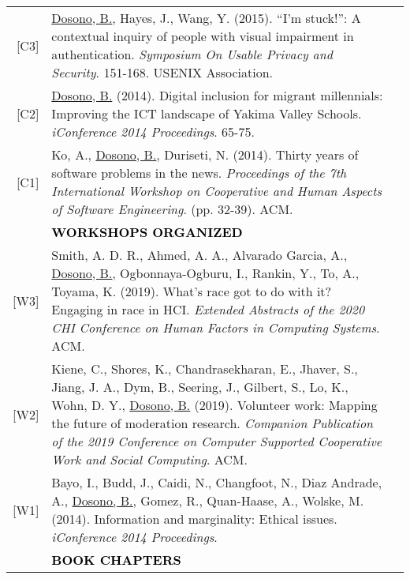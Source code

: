 \documentclass[11pt]{article}
\begin{document}
{{\begin{longtable}{Rp{0.75in}p{5.0in}}
\footnotesize{[C3]} & \href{https://www.usenix.org/conference/soups2015/proceedings/presentation/dosono}{Dosono, B.}, Hayes, J., Wang, Y. (2015). ``I'm stuck!'': A contextual inquiry of people with visual impairment in authentication. \textit{Symposium On Usable Privacy and Security}. 151-168. USENIX Association.\\

\footnotesize{[C2]} & \href{https://doi.org/10.9776/14043}{Dosono, B.} (2014). Digital inclusion for migrant millennials: Improving the ICT landscape of Yakima Valley Schools. \textit{iConference 2014 Proceedings}. 65-75.\\

\footnotesize{[C1]} & Ko, A., \href{https://dl.acm.org/authorize?N41457}{Dosono, B.}, Duriseti, N. (2014). Thirty years of software problems in the news. \textit{Proceedings of the 7th International Workshop on Cooperative and Human Aspects of Software Engineering}. (pp. 32-39). ACM.\\

& \textcolor{black}{\uppercase{\textbf{Workshops Organized}}}\\

\footnotesize{[W3]} & Smith, A. D. R., Ahmed, A. A., Alvarado Garcia, A., \href{https://dl.acm.org/doi/10.1145/3334480.3375156?cid=88158835957}{Dosono, B.}, Ogbonnaya-Ogburu, I., Rankin, Y., To, A., Toyama, K. (2019). What's race got to do with it? Engaging in race in HCI. \textit{Extended Abstracts of the 2020 CHI Conference on Human Factors in Computing Systems}. ACM.\\

\footnotesize{[W2]} & Kiene, C., Shores, K., Chandrasekharan, E., Jhaver, S., Jiang, J. A., Dym, B., Seering, J., Gilbert, S., Lo, K., Wohn, D. Y., \href{https://dl.acm.org/authorize?N690536}{Dosono, B.} (2019). Volunteer work: Mapping the future of moderation research. \textit{Companion Publication of the 2019 Conference on Computer Supported Cooperative Work and Social Computing}. ACM.\\

\footnotesize{[W1]} & Bayo, I., Budd, J., Caidi, N., Changfoot, N., Diaz Andrade, A., \href{https://doi.org/10.9776/14223}{Dosono, B.}, Gomez, R., Quan-Haase, A., Wolske, M. (2014). Information and marginality: Ethical issues. \textit{iConference 2014 Proceedings}.\\

& \textcolor{black}{\uppercase{\textbf{Book Chapters}}}\\


\end{longtable}}}
\end{document}
